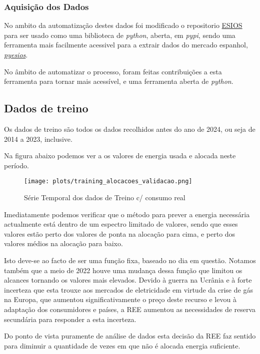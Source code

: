 \subsubsection{Aquisição dos Dados}
\text{ }  \par

No ambito da automatização destes dados foi modificado o repositorio \href{https://github.com/SanPen/\gls{ESIOS}}{\gls{ESIOS}} para ser usado como uma biblioteca de \textit{python}, aberta, em \textit{pypi}, sendo uma ferramenta mais facilmente acessivel para a extrair dados do mercado espanhol, \href{https://pypi.org/project/pyesios/}{\textit{pyesios}}.\par
No âmbito de automatizar o processo, foram feitas contribuições a esta ferramenta para tornar mais acessível, e uma ferramenta aberta de \textit{python}.\par


\thispagestyle{plain}
 \label{se:dadoscrus}



\thispagestyle{plain}
 \label{se:tratamentodados}

\subsection{Dados de treino}

Os dados de treino são todos os dados recolhidos antes do ano de 2024, ou seja de 2014 a 2023, inclusive.\par
Na figura abaixo podemos ver a os valores de energia usada e alocada neste período.

\begin{figure}[H]
    \centering
    \texttt{[image: plots/training\_alocacoes\_validacao.png]}
    \caption{Série Temporal dos dados de Treino c/ consumo real}
    \label{fig:trainingtimeseries}
\end{figure}

Imediatamente podemos verificar que o método para prever a energia necessária actualmente está dentro de um espectro limitado de valores, sendo que esses valores estão perto dos valores de ponta na alocação para cima, e perto dos valores médios na alocação para baixo.\par
Isto deve-se ao facto de ser uma função fixa, baseado no dia em questão. Notamos também que a meio de 2022 houve uma mudança dessa função que limitou os alcances tornando os valores mais elevados. Devido à guerra na Ucrânia e à forte incerteza que esta trouxe aos mercados de eletricidade em virtude da crise de gás na Europa, que aumentou significativamente o preço deste recurso e levou à adaptação dos consumidores e países, a \gls{REE} aumentou as necessidades de reserva secundária para responder a esta incerteza.\par
Do ponto de vista puramente de análise de dados esta decisão da \gls{REE} faz sentido para diminuir a quantidade  de vezes em que não é alocada energia suficiente.\par

